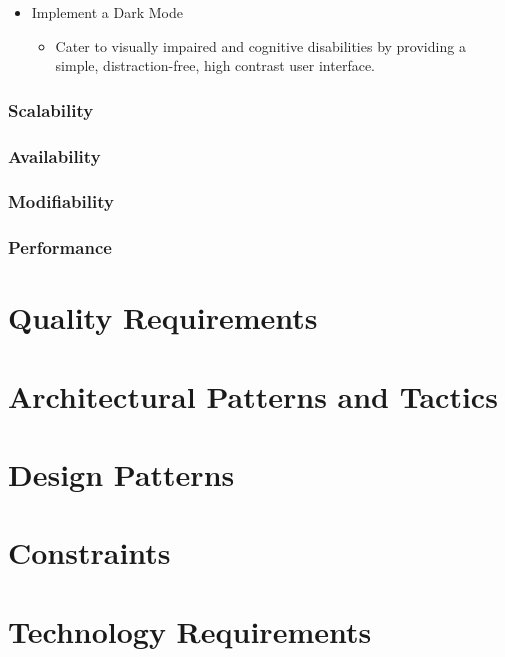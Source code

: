\documentclass[12pt]{article}
\begin{document}
\begin{itemize}
  \item Implement a Dark Mode
        \begin{itemize}
          \item Cater to visually impaired and cognitive disabilities by providing a simple, distraction-free, high contrast user interface.
        \end{itemize}
\end{itemize}

\subsubsection*{Scalability}

\subsubsection*{Availability}

\subsubsection*{Modifiability}

\subsubsection*{Performance}




\newpage

\section{Quality Requirements}

\newpage

\section{Architectural Patterns and Tactics}

\newpage

\section{Design Patterns}

\newpage

\section{Constraints}

\newpage

\section{Technology Requirements}

\newpage
\end{document}
